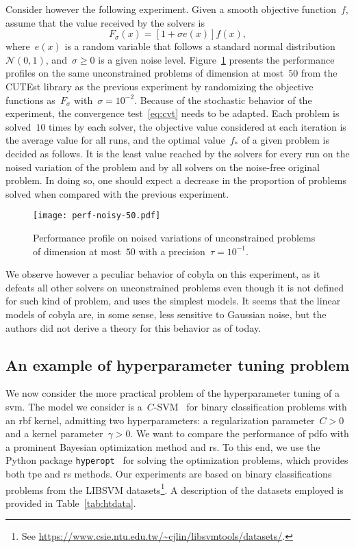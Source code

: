 \documentclass[
    smallextended,  %
    draft,          %
]{svjour3}
\newcommand{\obj}{f}
\begin{document}
Consider however the following experiment.
Given a smooth objective function~$\obj$, assume that the value received by the solvers is
\begin{equation*}
    F_{\sigma}(x) = [1 + \sigma e(x)] \obj(x),
\end{equation*}
where~$e(x)$ is a random variable that follows a standard normal distribution~$\mathcal{N}(0, 1)$, and~$\sigma \ge 0$ is a given noise level.
Figure~\ref{fig:ppun-50} presents the performance profiles on the same unconstrained problems of dimension at most~$50$ from the CUTEst library as the previous experiment by randomizing the objective functions as~$F_{\sigma}$ with~$\sigma = 10^{-2}$.
Because of the stochastic behavior of the experiment, the convergence test~\eqref{eq:cvt} needs to be adapted.
Each problem is solved~$10$ times by each solver, the objective value considered at each iteration is the average value for all runs, and the optimal value~$f_{\ast}$ of a given problem is decided as follows.
It is the least value reached by the solvers for every run on the noised variation of the problem and by all solvers on the noise-free original problem.
In doing so, one should expect a decrease in the proportion of problems solved when compared with the previous experiment.

\begin{figure}[ht]
    \centering
    \texttt{[image: perf-noisy-50.pdf]}
    \caption{Performance profile on noised variations of unconstrained problems of dimension at most~$50$ with a precision~$\tau = 10^{-1}$.}
    \label{fig:ppun-50}
\end{figure}

We observe however a peculiar behavior of \gls{cobyla} on this experiment, as it defeats all other solvers on unconstrained problems even though it is not defined for such kind of problem, and uses the simplest models.
It seems that the linear models of \gls{cobyla} are, in some sense, less sensitive to Gaussian noise, but the authors did not derive a theory for this behavior as of today.

\subsection{An example of hyperparameter tuning problem}

We now consider the more practical problem of the hyperparameter tuning of a \gls{svm}.
The model we consider is a~$C$-SVM~\cite{Chang_Lin_2011} for binary classification problems with an \gls{rbf} kernel, admitting two hyperparameters: a regularization parameter~$C > 0$ and a kernel parameter~$\gamma > 0$.
We want to compare the performance of \gls{pdfo} with a prominent Bayesian optimization method and \gls{rs}.
To this end, we use the Python package \texttt{hyperopt}~\cite{Bergstra_Yamins_Cox_2013} for solving the optimization problems, which provides both \gls{tpe} and \gls{rs} methods.
Our experiments are based on binary classifications problems from the LIBSVM datasets\footnote{See \url{https://www.csie.ntu.edu.tw/~cjlin/libsvmtools/datasets/}.}.
A description of the datasets employed is provided in Table~\ref{tab:htdata}.
\end{document}
